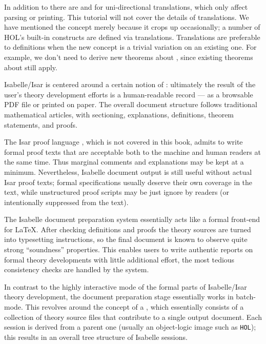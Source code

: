 \begin{isabellebody}
\begin{isamarkuptext}
In addition to \isa{{\isasymrightleftharpoons}} there are
\isa{{\isasymrightharpoonup}}
and \isa{{\isasymleftharpoondown}}
for uni-directional translations, which only affect
parsing or printing.  This tutorial will not cover the details of
translations.  We have mentioned the concept merely because it
crops up occasionally; a number of HOL's built-in constructs are defined
via translations.  Translations are preferable to definitions when the new 
concept is a trivial variation on an existing one.  For example, we
don't need to derive new theorems about \isa{{\isasymnoteq}}, since existing theorems
about \isa{{\isacharequal}} still apply.%
%
%
\end{isamarkuptext}%
\isamarkuptrue%
%
\isamarkuptrue%
%
\begin{isamarkuptext}%
Isabelle/Isar is centered around a certain notion of : ultimately the result of the
  user's theory development efforts is a human-readable record --- as
  a browsable PDF file or printed on paper.  The overall document
  structure follows traditional mathematical articles, with
  sectioning, explanations, definitions, theorem statements, and
  proofs.

  The Isar proof language \cite{Wenzel-PhD}, which is not covered in
  this book, admits to write formal proof texts that are acceptable
  both to the machine and human readers at the same time.  Thus
  marginal comments and explanations may be kept at a minimum.
  Nevertheless, Isabelle document output is still useful without
  actual Isar proof texts; formal specifications usually deserve their
  own coverage in the text, while unstructured proof scripts may be
  just ignore by readers (or intentionally suppressed from the text).

  \medskip The Isabelle document preparation system essentially acts
  like a formal front-end for {\LaTeX}.  After checking definitions
  and proofs the theory sources are turned into typesetting
  instructions, so the final document is known to observe quite strong
  ``soundness'' properties.  This enables users to write authentic
  reports on formal theory developments with little additional effort,
  the most tedious consistency checks are handled by the system.%
\end{isamarkuptext}%
\isamarkuptrue%
%
\isamarkuptrue%
%
\begin{isamarkuptext}%
In contrast to the highly interactive mode of the formal parts of
  Isabelle/Isar theory development, the document preparation stage
  essentially works in batch-mode.  This revolves around the concept
  of a , which essentially consists of a collection
  of theory source files that contribute to a single output document.
  Each session is derived from a parent one (usually an object-logic
  image such as \texttt{HOL}); this results in an overall tree
  structure of Isabelle sessions.


\end{isamarkuptext}
\end{isabellebody}
